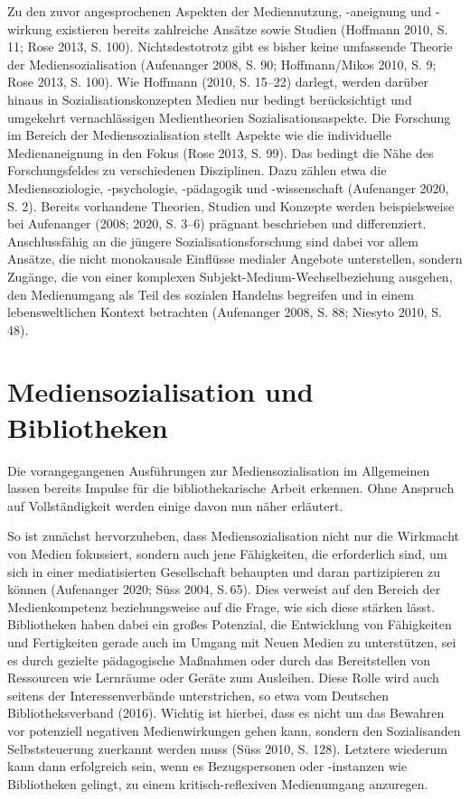 \documentclass[a4paper,
fontsize=11pt,
oneside,
numbers=noperiodatend,
parskip=half-,
bibliography=totoc,
final
]{scrartcl}
\begin{document}
Zu den zuvor angesprochenen Aspekten der Mediennutzung, -aneignung und
-wirkung existieren bereits zahlreiche Ansätze sowie Studien (Hoffmann
2010, S. 11; Rose 2013, S. 100). Nichtsdestotrotz gibt es bisher keine
umfassende Theorie der Mediensozialisation (Aufenanger 2008, S. 90;
Hoffmann/Mikos 2010, S. 9; Rose 2013, S. 100). Wie Hoffmann (2010, S.
15--22) darlegt, werden darüber hinaus in Sozialisationskonzepten Medien
nur bedingt berücksichtigt und umgekehrt vernachlässigen Medientheorien
Sozialisationsaspekte. Die Forschung im Bereich der Mediensozialisation
stellt Aspekte wie die individuelle Medienaneignung in den Fokus (Rose
2013, S. 99). Das bedingt die Nähe des Forschungsfeldes zu verschiedenen
Disziplinen. Dazu zählen etwa die Mediensoziologie, -psychologie,
-pädagogik und -wissenschaft (Aufenanger 2020, S. 2). Bereits vorhandene
Theorien, Studien und Konzepte werden beispielsweise bei Aufenanger
(2008; 2020, S. 3--6) prägnant beschrieben und differenziert.
Anschlussfähig an die jüngere Sozialisationsforschung sind dabei vor
allem Ansätze, die nicht monokausale Einflüsse medialer Angebote
unterstellen, sondern Zugänge, die von einer komplexen
Subjekt-Medium-Wechselbeziehung ausgehen, den Medienumgang als Teil des
sozialen Handelns begreifen und in einem lebensweltlichen Kontext
betrachten (Aufenanger 2008, S. 88; Niesyto 2010, S. 48).

\hypertarget{mediensozialisation-und-bibliotheken}{%
\section{Mediensozialisation und
Bibliotheken}\label{mediensozialisation-und-bibliotheken}}

Die vorangegangenen Ausführungen zur Mediensozialisation im Allgemeinen
lassen bereits Impulse für die bibliothekarische Arbeit erkennen. Ohne
Anspruch auf Vollständigkeit werden einige davon nun näher erläutert.

So ist zunächst hervorzuheben, dass Mediensozialisation nicht nur die
Wirkmacht von Medien fokussiert, sondern auch jene Fähigkeiten, die
erforderlich sind, um sich in einer mediatisierten Gesellschaft
behaupten und daran partizipieren zu können (Aufenanger 2020; Süss 2004,
S.\,65). Dies verweist auf den Bereich der Medienkompetenz
beziehungsweise auf die Frage, wie sich diese stärken lässt.
Bibliotheken haben dabei ein großes Potenzial, die Entwicklung von
Fähigkeiten und Fertigkeiten gerade auch im Umgang mit Neuen Medien zu
unterstützen, sei es durch gezielte pädagogische Maßnahmen oder durch
das Bereitstellen von Ressourcen wie Lernräume oder Geräte zum
Ausleihen. Diese Rolle wird auch seitens der Interessenverbände
unterstrichen, so etwa vom Deutschen Bibliotheksverband (2016). Wichtig
ist hierbei, dass es nicht um das Bewahren vor potenziell negativen
Medienwirkungen gehen kann, sondern den Sozialisanden Selbststeuerung
zuerkannt werden muss (Süss 2010, S. 128). Letztere wiederum kann dann
erfolgreich sein, wenn es Bezugspersonen oder -instanzen wie
Bibliotheken gelingt, zu einem kritisch-reflexiven Medienumgang
anzuregen.
\end{document}
